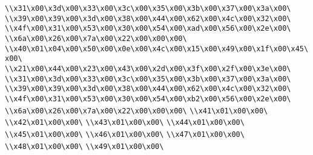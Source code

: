 \verb|\\x31\x00\x3d\x00\x33\x00\x3c\x00\x35\x00\x3b\x00\x37\x00\x3a\x00\|\newline
\verb|\\x39\x00\x39\x00\x3d\x00\x38\x00\x44\x00\x62\x00\x4c\x00\x32\x00\|\newline
\verb|\\x4f\x00\x31\x00\x53\x00\x30\x00\x54\x00\xad\x00\x56\x00\x2e\x00\|\newline
\verb|\\x6a\x00\x26\x00\x7a\x00\x22\x00\x00\x00\|\newline
\verb|\\x40\x01\x04\x00\x50\x00\x0e\x00\x4c\x00\x15\x00\x49\x00\x1f\x00\x45\x00\|\newline
\verb|\\x21\x00\x44\x00\x23\x00\x43\x00\x2d\x00\x3f\x00\x2f\x00\x3e\x00\|\newline
\verb|\\x31\x00\x3d\x00\x33\x00\x3c\x00\x35\x00\x3b\x00\x37\x00\x3a\x00\|\newline
\verb|\\x39\x00\x39\x00\x3d\x00\x38\x00\x44\x00\x62\x00\x4c\x00\x32\x00\|\newline
\verb|\\x4f\x00\x31\x00\x53\x00\x30\x00\x54\x00\xb2\x00\x56\x00\x2e\x00\|\newline
\verb|\\x6a\x00\x26\x00\x7a\x00\x22\x00\x00\x00\|\newline
\verb|\\x41\x01\x00\x00\|\newline
\verb|\\x42\x01\x00\x00\|\newline
\verb|\\x43\x01\x00\x00\|\newline
\verb|\\x44\x01\x00\x00\|\newline
\verb|\\x45\x01\x00\x00\|\newline
\verb|\\x46\x01\x00\x00\|\newline
\verb|\\x47\x01\x00\x00\|\newline
\verb|\\x48\x01\x00\x00\|\newline
\verb|\\x49\x01\x00\x00\|\newline
